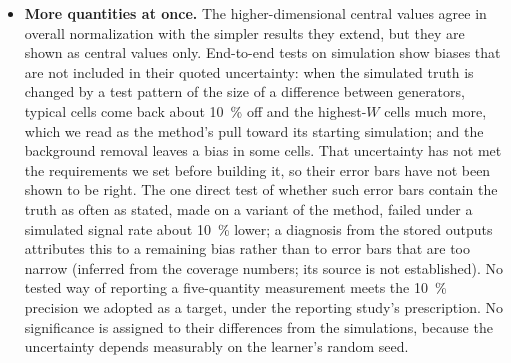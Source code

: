 \begin{itemize}
\item \textbf{More quantities at once.} The higher-dimensional central values agree in overall normalization with the simpler results they extend, but they are shown as central values only. End-to-end tests on simulation show biases that are not included in their quoted uncertainty: when the simulated truth is changed by a test pattern of the size of a difference between generators, typical cells come back about \SI{10}{\percent} off and the highest-$W$ cells much more, which we read as the method's pull toward its starting simulation; and the background removal leaves a bias in some cells. That uncertainty has not met the requirements we set before building it, so their error bars have not been shown to be right. The one direct test of whether such error bars contain the truth as often as stated, made on a variant of the method, failed under a simulated signal rate about \SI{10}{\percent} lower; a diagnosis from the stored outputs attributes this to a remaining bias rather than to error bars that are too narrow (inferred from the coverage numbers; its source is not established). No tested way of reporting a five-quantity measurement meets the \SI{10}{\percent} precision we adopted as a target, under the reporting study's prescription. No significance is assigned to their differences from the simulations, because the uncertainty depends measurably on the learner's random seed.

\end{itemize}

